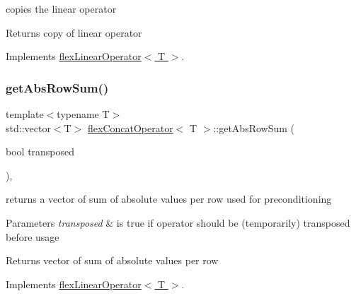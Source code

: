 copies the linear operator 

\begin{DoxyReturn}{Returns}
copy of linear operator 
\end{DoxyReturn}


Implements \hyperlink{classflex_linear_operator_a7cc1425677cc30fcbd092ffd28d508c9}{flex\+Linear\+Operator$<$ T $>$}.

\mbox{\label{classflex_concat_operator_a6cae0c9545cf1afd8ac0ebc418fa3327}} 
\subsubsection{\texorpdfstring{get\+Abs\+Row\+Sum()}{getAbsRowSum()}}
{\footnotesize\ttfamily template$<$typename T$>$ \\
std\+::vector$<$T$>$ \hyperlink{classflex_concat_operator}{flex\+Concat\+Operator}$<$ T $>$\+::get\+Abs\+Row\+Sum (\begin{DoxyParamCaption}\item[{bool}]{transposed }\end{DoxyParamCaption})\hspace{0.3cm}{\ttfamily [inline]}, {\ttfamily [virtual]}}



returns a vector of sum of absolute values per row used for preconditioning 


\begin{DoxyParams}{Parameters}
{\em transposed} & is true if operator should be (temporarily) transposed before usage \\
\hline
\end{DoxyParams}
\begin{DoxyReturn}{Returns}
vector of sum of absolute values per row 
\end{DoxyReturn}


Implements \hyperlink{classflex_linear_operator_ad6caa7b09e6e3c401cadef61b8e2307e}{flex\+Linear\+Operator$<$ T $>$}.

\mbox{\label{classflex_concat_operator_a76e35865b16975bfcd6431879bda195b}} 
